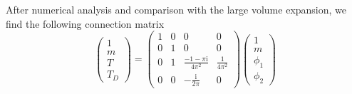 \documentclass[11pt, a4paper]{article}
\newcommand{\ii}{\mathrm{i}}
\numberwithin{equation}{section}
\begin{document}
After numerical analysis and comparison with the large volume expansion, we find the following connection matrix
\begin{equation}
  \begin{pmatrix}
1 \\[2pt]
m \\[2pt]
T \\[2pt]
T_D
\end{pmatrix}
=
\begin{pmatrix}
1 & 0 & 0 & 0 \\
0 & 1 & 0 & 0 \\
0 & 1 & \frac{-1-\pi \ii}{4\pi^2} & \frac{1}{4\pi^2} \\
0 & 0 & -\frac{\ii}{2\pi} & 0
\end{pmatrix}
\begin{pmatrix}
1 \\[2pt]
m \\[2pt]
\phi_1 \\[2pt]
\phi_2
\end{pmatrix}
\end{equation}
\end{document}

